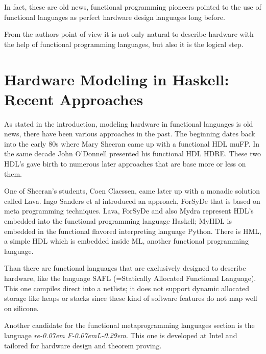 \documentclass[9pt,final,a4paper,leqno]{article}
\newcommand{\reFLect}{\textit{re\kern-0.07em F\kern-0.07emL\kern-0.29em\raisebox{0.56ex}{ect}}}
\begin{document}
\par
In fact, these are old news, functional programming pioneers pointed to the use of functional languages as perfect hardware design languages
long before. \cite{sheeran:perfect_match} %

\par
From the authors point of view it is not only natural to describe hardware with the help of functional programming languages, but also it is
the logical step.

\section{Hardware Modeling in Haskell: Recent Approaches}
\label{recent_approaches}
As stated in the introduction, modeling hardware in functional languages is old news, there have been various approaches in the past. The
beginning dates back into the early 80s where Mary Sheeran came up with a functional HDL muFP\cite{sheeran:muFP}. In the same decade John
O'Donnell presented his functional HDL HDRE\cite{hydra:old,donnell}. These two HDL's gave birth to numerous later approaches that are base
more or less on them. 

\par
One of Sheeran's students, Coen Claessen, came later up with a monadic solution called Lava\cite{claessen:hardware}. Ingo Sanders et al
introduced an approach, ForSyDe \cite{forsyde:phd,forsyde:ieee} that is based on meta programming techniques. Lava, ForSyDe and also Mydra %
represent HDL's embedded into the functional programming language Haskell; MyHDL \cite{myhdl} is embedded in the functional flavored
interpreting language Python. There is HML\cite{hml}, a simple HDL which is embedded inside ML, another functional programming language. 

\par
Than there are functional languages that are exclusively designed to describe hardware, like the language SAFL (=Statically Allocated
Functional Language)\cite{sharp,sharp:flash,sharp:codesign}. This one compiles direct into a netlists; it does not support dynamic allocated
storage like heaps or stacks since these kind of software features do not map well on silicone. 

\par
Another candidate for the functional metaprogramming languages section is the language \reFLect \cite{reflect}. This one is developed at
Intel and tailored for hardware design and theorem proving. 
\end{document}
